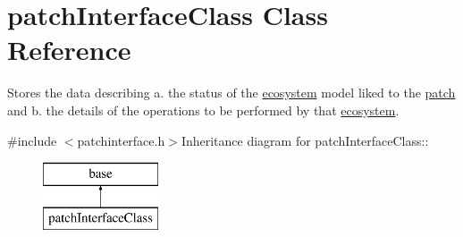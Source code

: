 \hypertarget{classpatch_interface_class}{
\section{patchInterfaceClass Class Reference}
\label{classpatch_interface_class}
}


Stores the data describing a. the status of the \hyperlink{classecosystem}{ecosystem} model liked to the \hyperlink{classpatch}{patch} and b. the details of the operations to be performed by that \hyperlink{classecosystem}{ecosystem}.  


{\ttfamily \#include $<$patchinterface.h$>$}Inheritance diagram for patchInterfaceClass::\begin{figure}[H]
\begin{center}
\leavevmode
\includegraphics[height=2cm]{classpatch_interface_class}
\end{center}
\end{figure}

